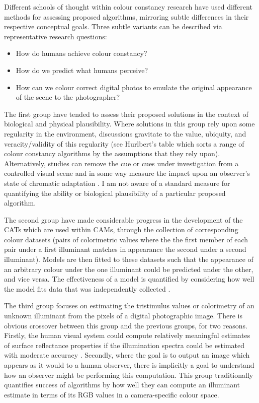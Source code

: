 Different schools of thought within colour constancy research have used different methods for assessing proposed algorithms, mirroring subtle differences in their respective conceptual goals. Three subtle variants can be described via representative research questions:

\begin{itemize}
\item{How do humans achieve colour constancy?}
\item{How do we predict what humans perceive?}
\item{How can we colour correct digital photos to emulate the original appearance of the scene to the photographer?}
\end{itemize}

The first group have tended to assess their proposed solutions in the context of biological and physical plausibility. Where solutions in this group rely upon some regularity in the environment, discussions gravitate to the value, ubiquity, and veracity/validity of this regularity (see Hurlbert's table \cite[p.~295]{hurlbert_computational_1998} which sorts a range of colour constancy algorithms by the assumptions that they rely upon). Alternatively, studies can remove the cue or cues under investigation from a controlled visual scene and in some way measure the impact upon an observer's state of chromatic adaptation \cite{kraft_mechanisms_1999}. I am not aware of a standard measure for quantifying the ability or biological plausibility of a particular proposed algorithm.

The second group have made considerable progress in the development of the \Glspl{CAT} which are used within \Glspl{CAM}, through the collection of corresponding colour datasets (pairs of colorimetric values where the the first member of each pair under a first illuminant matches in appearance the second under a second illuminant). Models are then fitted to these datasets such that the appearance of an arbitrary colour under the one illuminant could be predicted under the other, and vice versa. The effectiveness of a model is quantified by considering how well the model fits data that was independently collected \cite{cie_cie_2004-1}.

The third group focuses on estimating the tristimulus values or colorimetry of an unknown illuminant from the pixels of a digital photographic image. There is obvious crossover between this group and the previous groups, for two reasons.
Firstly, the human visual system could compute relatively meaningful estimates of surface reflectance properties if the illumination spectra could be estimated with moderate accuracy \cite{maloney_computational_1984}. Secondly, where the goal is to output an image which appears as it would to a human observer, there is implicitly a goal to understand how an observer might be performing this computation. This group traditionally quantifies success of algorithms by how well they can compute an illuminant estimate in terms of its RGB values in a camera-specific colour space.

